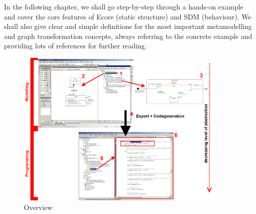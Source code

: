 In the following chapter, we shall go step-by-step through a hands-on example and cover the core features of Ecore (static structure) and SDM (behaviour). 
We shall also give clear and simple definitions for the most important metamodelling and graph transformation concepts, always referring to the concrete example and providing lots of references for further reading.

\begin{figure}[htbp]
	\centering
  \includegraphics[width=0.9\textwidth]{pics/installationAndSetup/tafelbild}
	\caption{Overview}
	\label{fig_Overview}
\end{figure}